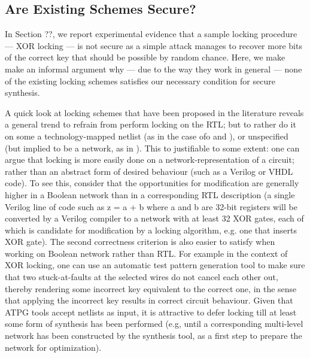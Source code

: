 \subsection{Are Existing Schemes Secure?}
In Section ??, we report experimental evidence that a sample locking procedure --- XOR locking --- is not secure as a simple attack manages to recover more bits of the correct key that should be possible by random chance. Here, we make make an informal argument why --- due to the way they work in general --- none of the existing locking schemes satisfies our necessary condition for secure synthesis.

A quick look at locking schemes that have been proposed in the literature reveals a general trend to refrain from perform locking on the RTL; but to rather do it on some a technology-mapped netlist (as in the case ofo \cite{} and \cite{}), or unspecified (but implied to be a network, as in \cite{}). This to justifiable to some extent: one can argue that locking is more easily done on a network-representation of a circuit; rather than an abstract form of desired behaviour (such as a Verilog or VHDL code). To see this, consider that the opportunities for modification are generally higher in a Boolean network than in a corresponding RTL description (a single Verilog line of code such as z = a + b where a and b are 32-bit registers will be converted by a Verilog compiler to a network with at least 32 XOR gates, each of which is candidate for modification by a locking algorithm, e.g. one that inserts XOR gate). The second correctness criterion is also easier to satisfy when working on Boolean network rather than RTL. For example in the context of XOR locking, one can use an automatic test pattern generation tool to make sure that two stuck-at-faults at the selected wires do not cancel each other out, thereby rendering some incorrect key equivalent to the correct one, in the sense that applying the incorrect key results in correct circuit behaviour. Given that ATPG tools accept netlists as input, it is attractive to defer locking till at least some form of synthesis has been performed (e.g, until a corresponding multi-level network has been constructed by the synthesis tool, as a first step to prepare the network for optimization).

